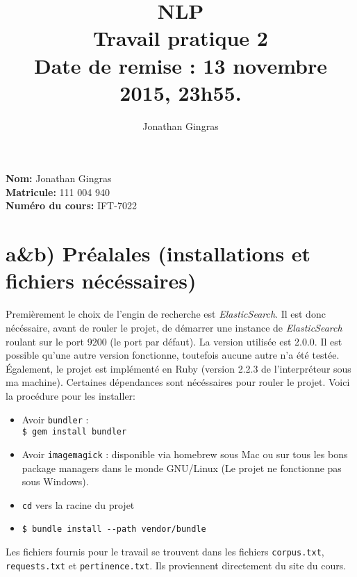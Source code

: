 \documentclass[12pt]{article}
\begin{document}
\title{NLP \\ Travail pratique 2 \\ Date de remise : 13 novembre 2015, 23h55.}
\author{Jonathan Gingras}

\maketitle

\begin{center}
\textbf{Nom:} Jonathan Gingras
\textbf{\\Matricule:} 111 004 940
\textbf{\\Numéro du cours:} IFT-7022
\end{center}

\clearpage


\section{a\&b) Préalales (installations et fichiers nécéssaires)}
Premièrement le choix de l'engin de recherche est \textit{ElasticSearch}. Il est donc nécéssaire, avant de rouler le projet, de démarrer une instance de \textit{ElasticSearch} roulant sur le port 9200 (le port par défaut). La version utilisée est 2.0.0. Il est possible qu'une autre version fonctionne, toutefois aucune autre n'a été testée.\\

Également, le projet est implémenté en Ruby (version 2.2.3 de l'interpréteur sous ma machine). Certaines dépendances sont nécéssaires pour rouler le projet. Voici la procédure pour les installer:\\

\begin{itemize}
\item Avoir \verb;bundler; :\\ \verb;$ gem install bundler;
\item Avoir \verb;imagemagick; : disponible via homebrew sous Mac ou sur tous les bons package managers dans le monde GNU/Linux (Le projet ne fonctionne pas sous Windows).
\item \verb;cd; vers la racine du projet
\item \verb;$ bundle install --path vendor/bundle;\\
\end{itemize}

Les fichiers fournis pour le travail se trouvent dans les fichiers \verb;corpus.txt;, \verb;requests.txt; et \verb;pertinence.txt;. Ils proviennent directement du site du cours. 
\end{document}
